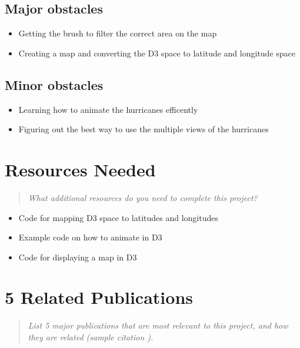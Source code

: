\documentclass{proc}
\begin{document}
\subsection{Major obstacles} %

\begin{itemize}
\item Getting the brush to filter the correct area on the map
\item Creating a map and converting the D3 space to latitude and longitude space
\end{itemize}

\subsection{Minor obstacles}

\begin{itemize}
\item Learning how to animate the hurricanes efficently
\item Figuring out the best way to use the multiple views of the hurricanes
\end{itemize}

\section{Resources Needed}
\begin{quote}
\textit{What additional resources do you need to complete this project?}
\end{quote}

\begin{itemize}
\item Code for mapping D3 space to latitudes and longitudes
\item Example code on how to animate in D3
\item Code for displaying a map in D3
\end{itemize}

\section{5 Related Publications}
\begin{quote}
\textit{List 5 major publications that are most relevant to this project, and how they are related (sample citation \cite{wijk2005value}).}
\end{quote}
\end{document}

